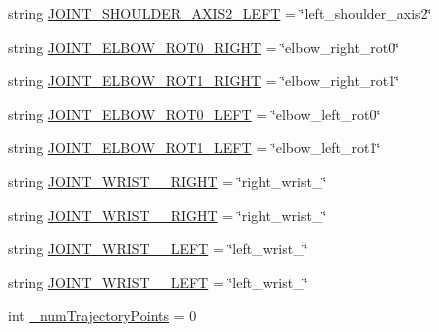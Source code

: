 \begin{DoxyCompactItemize}
\item 
string \mbox{\hyperlink{namespacesteering__interpolate__and__print_a7ab61dd876a5da538b12d99c1d9bd54a}{J\+O\+I\+N\+T\+\_\+\+S\+H\+O\+U\+L\+D\+E\+R\+\_\+\+A\+X\+I\+S2\+\_\+\+L\+E\+FT}} = \char`\"{}left\+\_\+shoulder\+\_\+axis2\char`\"{}
\item 
string \mbox{\hyperlink{namespacesteering__interpolate__and__print_ad824ef9ede0e857e99c6f78bf1453e84}{J\+O\+I\+N\+T\+\_\+\+E\+L\+B\+O\+W\+\_\+\+R\+O\+T0\+\_\+\+R\+I\+G\+HT}} = \char`\"{}elbow\+\_\+right\+\_\+rot0\char`\"{}
\item 
string \mbox{\hyperlink{namespacesteering__interpolate__and__print_af5777dcd2ae9070f467c853af5f74a23}{J\+O\+I\+N\+T\+\_\+\+E\+L\+B\+O\+W\+\_\+\+R\+O\+T1\+\_\+\+R\+I\+G\+HT}} = \char`\"{}elbow\+\_\+right\+\_\+rot1\char`\"{}
\item 
string \mbox{\hyperlink{namespacesteering__interpolate__and__print_ab3bce3ba760667882526745ef829a2f0}{J\+O\+I\+N\+T\+\_\+\+E\+L\+B\+O\+W\+\_\+\+R\+O\+T0\+\_\+\+L\+E\+FT}} = \char`\"{}elbow\+\_\+left\+\_\+rot0\char`\"{}
\item 
string \mbox{\hyperlink{namespacesteering__interpolate__and__print_aaa6efbdf600dfcd65f904df99cf54fb2}{J\+O\+I\+N\+T\+\_\+\+E\+L\+B\+O\+W\+\_\+\+R\+O\+T1\+\_\+\+L\+E\+FT}} = \char`\"{}elbow\+\_\+left\+\_\+rot1\char`\"{}
\item 
string \mbox{\hyperlink{namespacesteering__interpolate__and__print_adadeb39401b26a4b221dc439d8ab015b}{J\+O\+I\+N\+T\+\_\+\+W\+R\+I\+S\+T\+\_\+\_\+\+R\+I\+G\+HT}} = \char`\"{}right\+\_\+wrist\+\_\char`\"{}
\item 
string \mbox{\hyperlink{namespacesteering__interpolate__and__print_a4a28201768067cb2ef948223efaf28e9}{J\+O\+I\+N\+T\+\_\+\+W\+R\+I\+S\+T\+\_\+\_\+\+R\+I\+G\+HT}} = \char`\"{}right\+\_\+wrist\+\_\char`\"{}
\item 
string \mbox{\hyperlink{namespacesteering__interpolate__and__print_a6d2e5e245431b6043acfa44ddb318744}{J\+O\+I\+N\+T\+\_\+\+W\+R\+I\+S\+T\+\_\+\_\+\+L\+E\+FT}} = \char`\"{}left\+\_\+wrist\+\_\char`\"{}
\item 
string \mbox{\hyperlink{namespacesteering__interpolate__and__print_a704ebf1e731fc7f13044fd12c0ac7e00}{J\+O\+I\+N\+T\+\_\+\+W\+R\+I\+S\+T\+\_\+\_\+\+L\+E\+FT}} = \char`\"{}left\+\_\+wrist\+\_\char`\"{}
\item 
int \mbox{\hyperlink{namespacesteering__interpolate__and__print_a010d02a1ae59da57df86c77a3d2d590f}{\+\_\+num\+Trajectory\+Points}} = 0
\item 

\end{DoxyCompactItemize}
